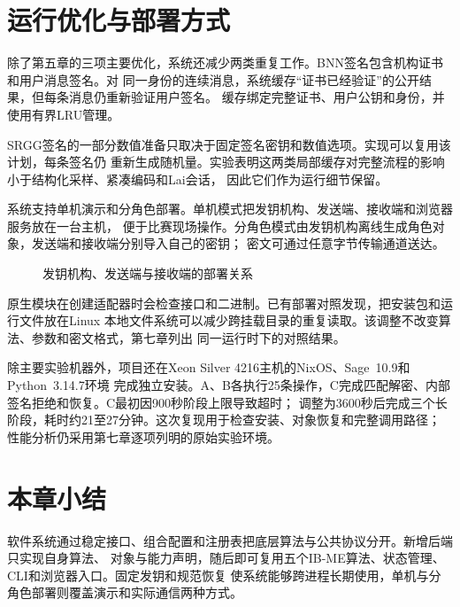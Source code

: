 \section{运行优化与部署方式}

除了第五章的三项主要优化，系统还减少两类重复工作。BNN签名包含机构证书和用户消息签名。对
同一身份的连续消息，系统缓存“证书已经验证”的公开结果，但每条消息仍重新验证用户签名。
缓存绑定完整证书、用户公钥和身份，并使用有界LRU管理。

SRGG签名的一部分数值准备只取决于固定签名密钥和数值选项。实现可以复用该计划，每条签名仍
重新生成随机量。实验表明这两类局部缓存对完整流程的影响小于结构化采样、紧凑编码和Lai会话，
因此它们作为运行细节保留。

系统支持单机演示和分角色部署。单机模式把发钥机构、发送端、接收端和浏览器服务放在一台主机，
便于比赛现场操作。分角色模式由发钥机构离线生成角色对象，发送端和接收端分别导入自己的密钥；
密文可通过任意字节传输通道送达。

\begin{figure}[H]
\centering
{}
\caption{发钥机构、发送端与接收端的部署关系}
\label{fig:deployment}
\end{figure}

原生模块在创建适配器时会检查接口和二进制。已有部署对照发现，把安装包和运行文件放在Linux
本地文件系统可以减少跨挂载目录的重复读取。该调整不改变算法、参数和密文格式，第七章列出
同一运行时下的对照结果。

除主要实验机器外，项目还在Xeon Silver 4216主机的NixOS、Sage~10.9和Python~3.14.7环境
完成独立安装。A、B各执行25条操作，C完成匹配解密、内部签名拒绝和恢复。C最初因900秒阶段上限导致超时；
调整为3600秒后完成三个长阶段，耗时约21至27分钟。这次复现用于检查安装、对象恢复和完整调用路径；
性能分析仍采用第七章逐项列明的原始实验环境。

\section{本章小结}

软件系统通过稳定接口、组合配置和注册表把底层算法与公共协议分开。新增后端只实现自身算法、
对象与能力声明，随后即可复用五个IB-ME算法、状态管理、CLI和浏览器入口。固定发钥和规范恢复
使系统能够跨进程长期使用，单机与分角色部署则覆盖演示和实际通信两种方式。
